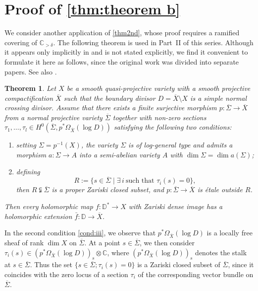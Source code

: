 \documentclass[11pt,english]{smfart}
\theoremstyle{plain}
\newtheorem{thm}{Theorem}[section]
\theoremstyle{definition}
\theoremstyle{remark}
\numberwithin{equation}{section}
\theoremstyle{plain}
\begin{document}
	
	
	
	
	
	


\section{Proof of \cref{thm:theorem b}}\label{sec:11}
 We consider another application of \cref{thm2nd}, whose proof requires a ramified covering of $\mathbb{C}_{>\delta}$.
The following theorem is used in Part~II of this series.
Although it appears only implicitly in \cite[\S 6]{CDY22original} and is not stated explicitly, we find it convenient to formulate it here as follows, since the original work \cite{CDY22original} was divided into separate papers.
See also \cite[\S 3]{Yam10}.

 
 

\begin{thm}\label{thm:20250911}
Let $X$ be a smooth quasi-projective variety with a smooth projective compactification $\overline{X}$ such that the boundary divisor $D=\overline{X}\setminus X$ is a simple normal crossing divisor. 
Assume that there exists a finite surjective morphism $p:\overline{\Sigma}\to \overline{X}$ from a normal projective variety $\overline{\Sigma}$ together with non-zero sections $\tau_1,\ldots,\tau_l \in H^0(\overline{\Sigma}, p^*\Omega_{\overline{X}}(\log D))$ satisfying the following two conditions:
\begin{enumerate}[label=(\roman*)]
\item \label{cond:i}
setting $\Sigma=p^{-1}(X)$, the variety $\Sigma$ is of log-general type and admits a morphism $a:\Sigma\to A$ into a semi-abelian variety $A$ with $\dim \Sigma=\dim a(\Sigma)$;
\item \label{cond:iii}
defining
\[ 
R:=\{s\in \overline{\Sigma} \mid \exists\, i \ \text{such that } \tau_i(s)=0 \}, 
\]
then $R\subsetneqq \overline{\Sigma}$ is a proper Zariski closed subset, and $p:\overline{\Sigma}\to \overline{X}$ is \'etale outside $R$.
\end{enumerate}
Then every holomorphic map $f:\mathbb D^*\to X$ with Zariski dense image has a holomorphic extension $\bar{f}:\mathbb D\to\overline{X}$.
\end{thm}

In the second condition \ref{cond:iii}, we observe that $p^*\Omega_{\overline{X}}(\log D)$ is a locally free sheaf of rank $\dim X$ on $\overline{\Sigma}$.
At a point $s\in\overline{\Sigma}$, we then consider
$\tau_i(s)\in (p^*\Omega_{\overline{X}}(\log D))_s\otimes \mathbb C$, where $(p^*\Omega_{\overline{X}}(\log D))_s$ denotes the stalk at $s\in\overline{\Sigma}$.
Thus the set $\{s\in\overline{\Sigma}; \tau_i(s)=0\}$ is a Zariski closed subset of $\overline{\Sigma}$, since it coincides with the zero locus of a section $\tau_i$ of the corresponding vector bundle on $\overline{\Sigma}$.
\end{document}
